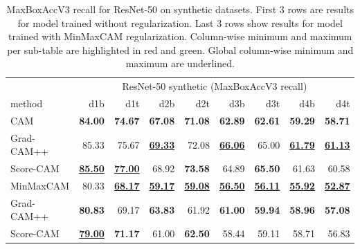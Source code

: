 \begin{table}[h]
\centering
\begin{tabular}{lrrrrrrrr}
\toprule
 & \multicolumn{8}{c}{ResNet-50 synthetic (MaxBoxAccV3 recall)} \\
method & d1b & d1t & d2b & d2t & d3b & d3t & d4b & d4t \\
\cmidrule(lr){1-1} \cmidrule(lr){2-9}
CAM & \color{purple} \bfseries 84.00 & \color{purple} \bfseries 74.67 & \color{purple} \bfseries 67.08 & \color{purple} \bfseries 71.08 & \color{purple} \bfseries 62.89 & \color{purple} \bfseries 62.61 & \color{purple} \bfseries 59.29 & \color{purple} \bfseries 58.71 \\
Grad-CAM++ & 85.33 & 75.67 & \color{teal} \bfseries \underline{69.33} & 72.08 & \color{teal} \bfseries \underline{66.06} & 65.00 & \color{teal} \bfseries \underline{61.79} & \color{teal} \bfseries \underline{61.13} \\
Score-CAM & \color{teal} \bfseries \underline{85.50} & \color{teal} \bfseries \underline{77.00} & 68.92 & \color{teal} \bfseries 73.58 & 64.89 & \color{teal} \bfseries 65.50 & 61.63 & 60.58 \\
\cmidrule(lr){1-1} \cmidrule(lr){2-9}
MinMaxCAM & 80.33 & \color{purple} \bfseries \underline{68.17} & \color{purple} \bfseries \underline{59.17} & \color{purple} \bfseries \underline{59.08} & \color{purple} \bfseries \underline{56.50} & \color{purple} \bfseries \underline{56.11} & \color{purple} \bfseries \underline{55.92} & \color{purple} \bfseries \underline{52.87} \\
Grad-CAM++ & \color{teal} \bfseries 80.83 & 69.17 & \color{teal} \bfseries 63.83 & 61.92 & \color{teal} \bfseries 61.00 & \color{teal} \bfseries 59.94 & \color{teal} \bfseries 58.96 & \color{teal} \bfseries 57.08 \\
Score-CAM & \color{purple} \bfseries \underline{79.00} & \color{teal} \bfseries 71.17 & 61.00 & \color{teal} \bfseries 62.50 & 58.44 & 59.11 & 58.71 & 56.83 \\
\bottomrule
\end{tabular}
\caption[MaxBoxAccV3 recall for ResNet-50 on synthetic datasets]{MaxBoxAccV3 recall for ResNet-50 on synthetic datasets. First 3 rows are results for model trained without regularization. Last 3 rows show results for model trained with MinMaxCAM regularization. Column-wise minimum and maximum per sub-table are highlighted in red and green. Global column-wise minimum and maximum are underlined.}
\label{tab:maxboxaccv3_recall_resnet50_synthetic}
\end{table}

